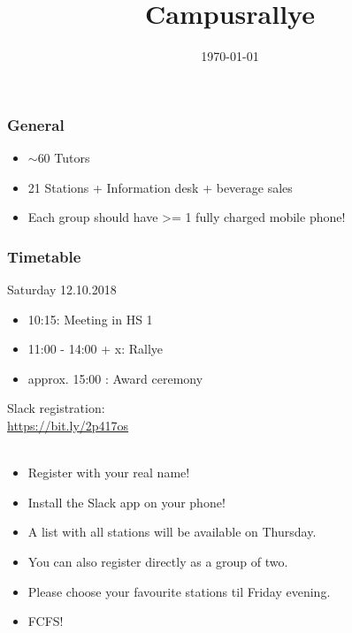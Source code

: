 \documentclass{beamer}
\title{Campusrallye}
\subtitle{}
\author{}
\date{\today}
\begin{document}
	
	\maketitle
	
	\begin{frame}
		\huge
		\center
		\frametitle{General}
		
		\begin{itemize}
			\item $\sim 60$  Tutors
			\item 21 Stations + Information desk + beverage sales 
			\item Each group should have >= 1 fully charged mobile phone!
		\end{itemize}
	\end{frame}
	
	
	
	\begin{frame}
		\huge
		
		\frametitle{Timetable}
		Saturday 12.10.2018\\
		
		\begin{itemize}
			\item 10:15: Meeting \normalsize in HS 1 \huge
			\item 11:00 - 14:00 + x: Rallye 
			\item approx. 15:00 : Award ceremony
		\end{itemize}
	\end{frame}
	
	
	
	
	\begin{frame}
		\huge
		\begin{center}
			Slack registration: \\
			\url{https://bit.ly/2p417os} \\ \ \\
		
		\end{center}
		\large
		\begin{itemize}
			\item Register with your real name!
			\item Install the Slack app on your phone!
			\item A list with all stations will be available on Thursday.
			\item You can also register directly as a group of two.
			\item Please choose your favourite stations til Friday evening.
			\item FCFS!
		\end{itemize}
		
	\end{frame}
	
\end{document}
